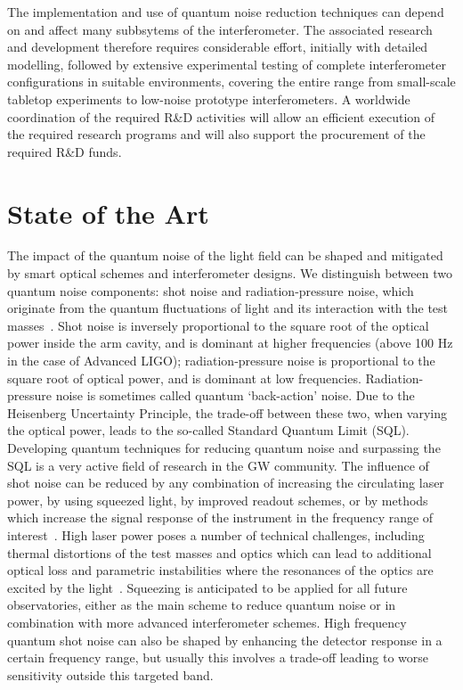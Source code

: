 The implementation and use of quantum noise reduction techniques can depend on and affect many subbsytems of the interferometer. The associated research and development therefore requires considerable effort, initially with detailed modelling, followed by extensive experimental testing of complete interferometer configurations in suitable environments, covering the entire range from small-scale tabletop experiments to low-noise prototype interferometers. A worldwide coordination of the required R\&D activities will allow an efficient execution of the required research programs and will also support the procurement of the required R\&D funds. 

\section{State of the Art}
The impact of the quantum noise of the light field can be shaped and mitigated by smart optical schemes and interferometer designs. We distinguish between two quantum noise components: shot noise and radiation-pressure noise, which originate from the quantum fluctuations of light and its interaction with the test masses~\cite{Cav1980}. Shot noise is inversely proportional to the square root of the optical power inside the arm cavity, and is dominant at higher frequencies (above 100 Hz in the case of Advanced LIGO); radiation-pressure noise is proportional to the square root of optical power, and is dominant at low frequencies. Radiation-pressure noise is sometimes called quantum `back-action' noise. Due to the Heisenberg Uncertainty Principle, the trade-off between these two, when varying the optical power, leads to the so-called Standard Quantum Limit (SQL). Developing quantum techniques for reducing quantum noise and surpassing the SQL is a very active field of research in the GW community. 
The influence of shot noise can be reduced by any combination of increasing the circulating laser power, by using squeezed light, by improved readout schemes, or by methods which increase the signal response of the instrument in the frequency range of interest~\cite{StMe1991,Mizuno:RSE1993,Osamu:2006}. High laser power poses a number of technical challenges, including thermal distortions of the test masses and optics which can lead to additional optical loss and parametric instabilities where the resonances of the optics are excited by the light~\cite{BSV2001,Evans:2015raa}. Squeezing is anticipated to be applied for all future observatories, either as the main scheme to reduce quantum noise or in combination with more advanced interferometer schemes. High frequency quantum shot noise can also be shaped by enhancing the detector response in a certain frequency range, but usually this involves a trade-off leading to worse sensitivity outside this targeted band.  

